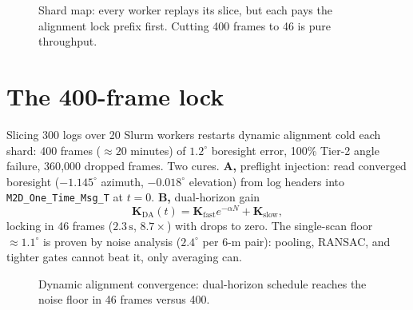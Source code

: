 \documentclass[11pt,oneside]{book}
\begin{document}
\begin{figure}[htbp]
\centering
{}
\caption{Shard map: every worker replays its slice, but each pays the
alignment lock prefix first. Cutting 400 frames to 46 is pure throughput.}
\label{fig:hpcc-slice}
\end{figure}

\section{The 400-frame lock}
\label{sec:lock}

Slicing 300 logs over 20 Slurm workers restarts dynamic alignment cold each
shard: 400 frames ($\approx20$ minutes) of $1.2^\circ$ boresight error,
100\% Tier-2 angle failure, 360{,}000 dropped frames. Two cures. \textbf{A,}
preflight injection: read converged boresight ($-1.145^\circ$ azimuth,
$-0.018^\circ$ elevation) from log headers into
\texttt{M2D\_One\_Time\_Msg\_T} at $t=0$. \textbf{B,} dual-horizon gain
\begin{equation}
\boxed{\mathbf{K}_{\mathrm{DA}}(t)=\mathbf{K}_{\mathrm{fast}}e^{-\alpha N}
+\mathbf{K}_{\mathrm{slow}},}
\label{eq:da-gain}
\end{equation}
locking in 46 frames ($2.3\,\mathrm{s}$, $8.7\times$) with drops to zero.
The single-scan floor $\approx1.1^\circ$ is proven by noise analysis
($2.4^\circ$ per 6-m pair): pooling, RANSAC, and tighter gates cannot beat
it, only averaging can.

\begin{figure}[htbp]
\centering
{}
\caption{Dynamic alignment convergence: dual-horizon schedule reaches the
noise floor in 46 frames versus 400.}
\label{fig:da-curve}
\end{figure}
\end{document}
